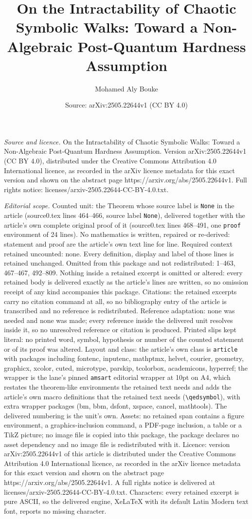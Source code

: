 \documentclass[10pt,a4paper]{amsart}
\title[On the Intractability of Chaotic Symbolic Walks: Toward a No]{On the Intractability of Chaotic Symbolic Walks: Toward a Non-Algebraic Post-Quantum Hardness Assumption}
\author{Mohamed Aly Bouke}
\date{Source: arXiv:2505.22644v1 (CC BY 4.0)}
\begin{document}
\maketitle

\noindent\emph{Source and licence.} On the Intractability of Chaotic Symbolic Walks: Toward a Non-Algebraic Post-Quantum Hardness Assumption. Version arXiv:2505.22644v1 (CC BY 4.0), distributed under the Creative Commons Attribution 4.0 International licence, as recorded in the arXiv licence metadata for this exact version and shown on the abstract page https://arxiv.org/abs/2505.22644v1. Full rights notice: licenses/arxiv-2505.22644-CC-BY-4.0.txt.\par\smallskip

\noindent\textit{Editorial scope.} Counted unit: the Theorem whose source label is \texttt{None} in the article (source0.tex lines 464--466, source label \texttt{None}), delivered together with the article's own complete original proof of it (source0.tex lines 468--491, one \texttt{proof} environment of 24 lines). No mathematics is written, repaired or re-derived: statement and proof are the article's own text line for line. Required context retained uncounted: none. Every definition, display and label of those lines is retained unchanged. Omitted from this package and not redistributed: 1--463, 467--467, 492--809. Nothing inside a retained excerpt is omitted or altered: every retained body is delivered exactly as the article's lines are written, so no omission receipt of any kind accompanies this package. Citations: the retained excerpts carry no citation command at all, so no bibliography entry of the article is transcribed and no reference is redistributed. Reference adaptation: none was needed and none was made; every reference inside the delivered unit resolves inside it, so no unresolved reference or citation is produced. Printed slips kept literal: no printed word, symbol, hypothesis or number of the counted statement or of its proof was altered. Layout and class: the article's own class is \texttt{article} with packages including fontenc, inputenc, mathptmx, helvet, courier, geometry, graphicx, xcolor, cuted, microtype, parskip, tcolorbox, academicons, hyperref; the wrapper is the lane's pinned \texttt{amsart} editorial wrapper at 10pt on A4, which restates the theorem-like environments the retained text needs and adds the article's own macro definitions that the retained text needs (\texttt{\textbackslash qedsymbol}), with extra wrapper packages (bm, bbm, dsfont, xspace, cancel, mathtools). The delivered numbering is the unit's own. Assets: no retained span contains a figure environment, a graphics-inclusion command, a PDF-page inclusion, a table or a TikZ picture; no image file is copied into this package, the package declares no asset dependency and no image file is redistributed with it. Licence: version arXiv:2505.22644v1 of this article is distributed under the Creative Commons Attribution 4.0 International licence, as recorded in the arXiv licence metadata for this exact version and shown on the abstract page https://arxiv.org/abs/2505.22644v1. A full rights notice is delivered at licenses/arxiv-2505.22644-CC-BY-4.0.txt. Characters: every retained excerpt is pure ASCII, so the delivered engine, XeLaTeX with its default Latin Modern text font, reports no missing character.
\end{document}
